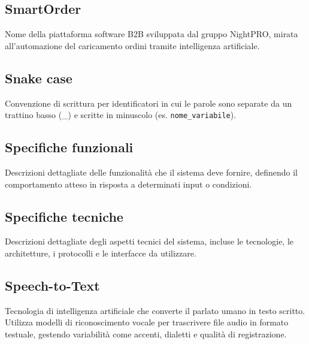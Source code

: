 \documentclass[a4paper, 11pt, oneside]{scrartcl} %
\begin{document}
\subsection*{SmartOrder}
Nome della piattaforma software B2B sviluppata dal gruppo NightPRO, mirata all'automazione del caricamento ordini tramite intelligenza artificiale.
\vspace{0.5cm}

\subsection*{Snake case}
Convenzione di scrittura per identificatori in cui le parole sono separate da un trattino basso (\_) e scritte in minuscolo (es. \texttt{nome\_variabile}).
\vspace{0.5cm}

\subsection*{Specifiche funzionali}


Descrizioni dettagliate delle funzionalità che il sistema deve fornire, definendo il comportamento atteso in risposta a determinati input o condizioni.

\vspace{0.5cm}

\subsection*{Specifiche tecniche}


Descrizioni dettagliate degli aspetti tecnici del sistema, incluse le tecnologie, le architetture, i protocolli e le interfacce da utilizzare.

\vspace{0.5cm}

\subsection*{Speech-to-Text}
Tecnologia di intelligenza artificiale che converte il parlato umano in testo scritto. Utilizza modelli di riconoscimento vocale per trascrivere file audio in formato testuale, gestendo variabilità come accenti, dialetti e qualità di registrazione.
\vspace{0.5cm}
\end{document}
